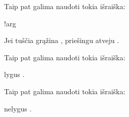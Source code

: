 \documentclass[letterpaper,10pt,lithuanian]{sphinxmanual}
\begin{document}

\begin{fulllineitems}
\label{\detokenize{formules:func.not}}
\pysigstartsignatures
{}
\pysigstopsignatures
\sphinxAtStartPar
Taip pat galima naudoti tokia išraiška:

\begin{sphinxVerbatim}[commandchars=\\\{\}]
!arg
\end{sphinxVerbatim}

\sphinxAtStartPar
Jei  tuščia grąžina , priešingu atveju .

\end{fulllineitems}


\begin{fulllineitems}
\label{\detokenize{formules:func.eq}}
\pysigstartsignatures
{}
\pysigstopsignatures
\sphinxAtStartPar
Taip pat galima naudoti tokia išraiška:

\begin{sphinxVerbatim}[commandchars=\\\{\}]
  
\end{sphinxVerbatim}

\sphinxAtStartPar
{} lygus .

\end{fulllineitems}


\begin{fulllineitems}
\label{\detokenize{formules:func.ne}}
\pysigstartsignatures
{}
\pysigstopsignatures
\sphinxAtStartPar
Taip pat galima naudoti tokia išraiška:

\begin{sphinxVerbatim}[commandchars=\\\{\}]
  
\end{sphinxVerbatim}

\sphinxAtStartPar
{} nelygus .

\end{fulllineitems}
\end{document}
